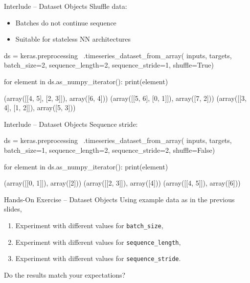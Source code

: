 \documentclass[ignorenonframetext,xcolor=x11names]{beamer}
\begin{document}
\begin{frame}[fragile]{Interlude -- Dataset Objects}
Shuffle data:
\begin{itemize}
    \item Batches do not continue sequence
    \item Suitable for stateless NN architectures
\end{itemize}

\begin{pythoncode}
ds = keras.preprocessing \
    .timeseries_dataset_from_array(
        inputs, 
        targets,
        batch_size=2, 
        sequence_length=2,
        sequence_stride=1, 
        shuffle=True)
        
for element in ds.as_numpy_iterator():
     print(element)

(array([[4, 5],
       [2, 3]]), array([6, 4]))
(array([[5, 6],
       [0, 1]]), array([7, 2]))
(array([[3, 4],
       [1, 2]]), array([5, 3]))
\end{pythoncode}
\end{frame}

\begin{frame}[fragile]{Interlude -- Dataset Objects}
Sequence stride:

\begin{pythoncode}
ds = keras.preprocessing \
    .timeseries_dataset_from_array(
        inputs, 
        targets,
        batch_size=1, 
        sequence_length=2,
        sequence_stride=2, 
        shuffle=False)
        
for element in ds.as_numpy_iterator():
     print(element)

(array([[0, 1]]), array([2]))
(array([[2, 3]]), array([4]))
(array([[4, 5]]), array([6]))
\end{pythoncode}
\end{frame}

\begin{frame}{Hands-On Exercise -- Dataset Objects}
Using example data as in the previous slides,
\begin{enumerate}
   \item Experiment with different values for \texttt{batch\_size},
   \item Experiment with different values for \texttt{sequence\_length},
   \item Experiment with different values for \texttt{sequence\_stride}.
\end{enumerate}
Do the results match your expectations?
\end{frame}
\end{document}
